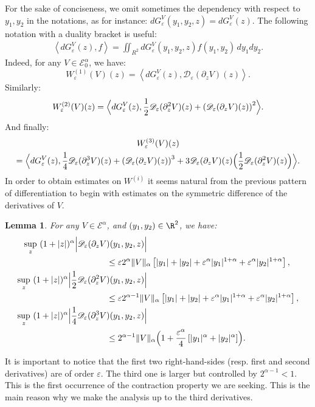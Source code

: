 \documentclass[JEP,XML,SOM,Unicode]{cedram}
\let\mathcal\mathscr
\theoremstyle{plain}
\newtheorem{lem}[thm]{Lemma}
\theoremstyle{definition}
\newcommand{\D}{\mathcal{D}_\eps}
\let\eps\varepsilon
\newcommand{\Babs}[1]{\Bigl\lvert#1\Bigr\rvert}
\newcommand{\Ea}{\mathcal{E}^\alpha}
\newcommand{\Eaz}{\mathcal{E}^\alpha_0}
\newcommand{\QV}{G_\eps^V}
\begin{document}
For the sake of conciseness, we omit sometimes the dependency with respect to $y_1,y_2$ in the notations, as for instance: $d\QV(y_1,y_2,z) = d\QV(z)$.
The following notation with a duality bracket is useful:
\begin{align*}
\left\langle d\QV(z), f \right\rangle = \iint_{R^2} d\QV(y_1,y_2,z) f(y_1, y_2)\, dy_1 dy_2.
\end{align*}
Indeed, for any $V \in \Eaz $, we have:
\begin{equation}\label{eq:W1}
W_\eps^{(1)}(V)(z)= \left\langle d\QV(z), \D(\partial_z V)(z)
\right\rangle.
\end{equation}
Similarly:
\begin{equation*}
W_\eps^{(2)}(V)(z) =
\Bigl\langle d\QV(z), \dfrac{1}{2} \D(\partial_z^2 V)(z) + \left(\D(\partial_z V)(z)
\right)^2
\Bigr\rangle.
\end{equation*}
And finally:
\begin{multline}\label{eq:W3V}
W_\eps^{(3)}(V)(z)\\ =
\Bigl\langle d\QV(z), \dfrac{1}{4} \D(\partial_z^3 V)(z) + \left(\D(\partial_z V)(z)\right)^3
+ 3 \D(\partial_z V)(z) \Bigl(\dfrac{1}{2}\D(\partial_z^2 V)(z) \Bigr) \Bigr\rangle.
\end{multline}
In order to obtain estimates on $W^{(i)}$ it seems natural from the previous pattern of differentiation to begin with estimates on the symmetric difference of the derivatives of $V$.
\begin{lem}\label{estim derivatives}
For any $V\in \Ea$, and $(y_1,y_2) \in \R^2$, we have:
\begin{align}
\label{estim der Ea 1}
\sup_z \ (1+|z|)^\alpha \Babs{ \D(\partial_z V&)(y_1,y_2,z) }\\
& \leq \eps 2^\alpha \Vert V \Vert_\alpha \left[\vert y_1 \vert+ \vert y_2 \vert + \eps^{\alpha}\vert y_1 \vert^{1+\alpha} + \eps^{\alpha}\vert y_2 \vert^{1+\alpha} \right],\notag\\
\label{estim der Ea 2}
\sup_z \ (1+|z|)^\alpha \Babs{ \dfrac{1}{2} \D(\partial_z^2 V&)(y_1,y_2,z) }\\
& \leq \eps 2^{\alpha-1} \Vert V \Vert_\alpha \left[\vert y_1 \vert+ \vert y_2 \vert + \eps^{\alpha}\vert y_1 \vert^{1+\alpha} + \eps^{\alpha}\vert y_2 \vert^{1+\alpha} \right],\notag\\
\label{estim der Ea 3}
\sup_z \ (1+|z|)^\alpha \Babs{ \dfrac{1}{4} \D(\partial_z^3 V&)(y_1,y_2,z)}\\
& \leq 2^{\alpha -1} \Vert V \Vert_\alpha \Bigl(1+ \frac{\eps^\alpha}4 \left[\vert y_1 \vert^{\alpha}+ \vert y_2 \vert^{\alpha} \right] \Bigr).\notag
\end{align}
\end{lem}
It is important to notice that the first two right-hand-sides (resp. first and second derivatives) are of order $\eps$. The third one is larger but controlled by $2^{\alpha-1}<1$. This is the first occurrence of the contraction property we are seeking. This is the main reason why we make the analysis up to the third derivatives.
\end{document}
